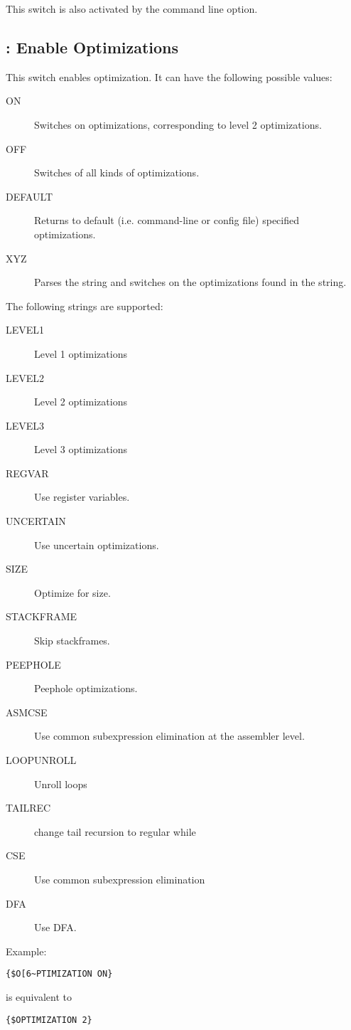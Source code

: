 This switch is also activated by the  command line option.

\subsection{ : Enable Optimizations}
\label{switch:optimization}
This switch enables optimization. It can have the following possible values:
\begin{description}
\item[ON] Switches on optimizations, corresponding to level 2 optimizations.
\item[OFF] Switches of all kinds of optimizations.
\item[DEFAULT] Returns to default (i.e. command-line or config file) specified optimizations.
\item[XYZ] Parses the string and switches on the optimizations found in the
string. 
\end{description}
The following strings are supported:
\begin{description}
\item[LEVEL1] Level 1 optimizations
\item[LEVEL2] Level 2 optimizations
\item[LEVEL3] Level 3 optimizations
\item[REGVAR] Use register variables.
\item[UNCERTAIN] Use uncertain optimizations.
\item[SIZE] Optimize for size.
\item[STACKFRAME] Skip stackframes. 
\item[PEEPHOLE] Peephole optimizations.
\item[ASMCSE] Use common subexpression elimination at the assembler level.
\item[LOOPUNROLL] Unroll loops
\item[TAILREC] change tail recursion to regular while
\item[CSE] Use common subexpression elimination
\item[DFA] Use DFA.
\end{description}

Example:
\begin{verbatim}
{$O[6~PTIMIZATION ON}
\end{verbatim}
is equivalent to 
\begin{verbatim}
{$OPTIMIZATION 2}
\end{verbatim}

